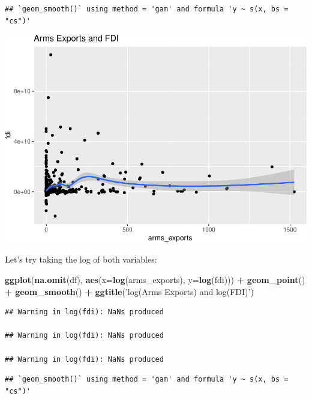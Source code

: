 \documentclass[12pt,]{article}
\newenvironment{Shaded}{\begin{snugshade}}{\end{snugshade}}
\newcommand{\DataTypeTok}[1]{\textcolor[rgb]{0.13,0.29,0.53}{#1}}
\newcommand{\KeywordTok}[1]{\textcolor[rgb]{0.13,0.29,0.53}{\textbf{#1}}}
\newcommand{\NormalTok}[1]{#1}
\newcommand{\OperatorTok}[1]{\textcolor[rgb]{0.81,0.36,0.00}{\textbf{#1}}}
\newcommand{\StringTok}[1]{\textcolor[rgb]{0.31,0.60,0.02}{#1}}
\begin{document}
\begin{verbatim}
## `geom_smooth()` using method = 'gam' and formula 'y ~ s(x, bs = "cs")'
\end{verbatim}

\includegraphics{proposal_files/figure-latex/unnamed-chunk-19-1.pdf}

Let's try taking the log of both variables:

\begin{Shaded}
\begin{Highlighting}[]
\KeywordTok{ggplot}\NormalTok{(}\KeywordTok{na.omit}\NormalTok{(df), }\KeywordTok{aes}\NormalTok{(}\DataTypeTok{x=}\KeywordTok{log}\NormalTok{(arms_exports), }\DataTypeTok{y=}\KeywordTok{log}\NormalTok{(fdi))) }\OperatorTok{+}\StringTok{ }
\StringTok{    }\KeywordTok{geom_point}\NormalTok{() }\OperatorTok{+}
\StringTok{    }\KeywordTok{geom_smooth}\NormalTok{() }\OperatorTok{+}
\StringTok{    }\KeywordTok{ggtitle}\NormalTok{(}\StringTok{'log(Arms Exports) and log(FDI)'}\NormalTok{)}
\end{Highlighting}
\end{Shaded}

\begin{verbatim}
## Warning in log(fdi): NaNs produced

## Warning in log(fdi): NaNs produced

## Warning in log(fdi): NaNs produced
\end{verbatim}

\begin{verbatim}
## `geom_smooth()` using method = 'gam' and formula 'y ~ s(x, bs = "cs")'
\end{verbatim}
\end{document}
